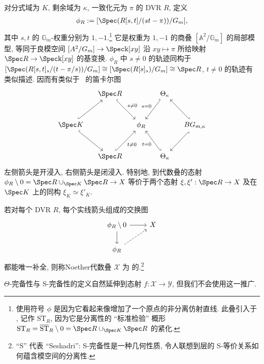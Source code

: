 对分式域为 $K$, 剩余域为 $\kappa$, 一致化元为 $\pi$ 的 DVR $R$, 定义
\begin{align}\label{src:7.9.13}
\phi_R:=[\Spec(R[s,t]/(st-\pi))/\mathbb G_m],
\end{align}
其中 $s,t$ 的 $\mathbb G_m$-权重分别为 $1,-1$.\footnote{使用符号 $\phi$ 是因为它看起来像增加了一个原点的非分离仿射直线. 此叠引入于 \cite[第~2.B 节]{Hei17}, 记作 $\overline{\mathrm{ST}}_R$, 因为它是分离性的 ``标准检验'' 概形 $\mathrm{ST}_R=\overline{\mathrm{ST}}_R\setminus0=\Spec R\cup_{\Spec K}\Spec R$ 的紧化.}
它是权重为 $1,-1$ 的商叠 $[\mathbb A^2/\mathbb G_m]$ 的局部模型, 等同于良模空间 $[\mathbb A^2/\mathbb G_m]\to\Spec\Bbbk[xy]$ 沿 $xy\mapsto\pi$ 所给映射 $\Spec R\to\Spec\Bbbk[xy]$ 的基变换. $\phi_R$ 中 $s\ne0$ 的轨迹同构于 $[\Spec(R[s,t]_s/(t-\pi/s))/\mathbb G_m]\cong[\Spec(R[s]_s)/\mathbb G_m]\cong\Spec R$, $t\ne0$ 的轨迹有类似描述. 因而有类似于~ 的笛卡尔图
\[\begin{tikzcd}[ampersand replacement=\&,column sep=small,row sep=large]
\&\Spec R\arrow[dr,hook,"{s\ne0}"]\&\&\Theta_\kappa\arrow[dl,hook',"{s=0}"']\&\\
\Spec K\arrow[ur,hook]\arrow[dr,hook]\&\&\phi_R\&\&B\mathbb G_{m,\kappa}\arrow[ul,hook']\arrow[dl,hook]\\
\&\Spec R\arrow[ur,hook,"{t\ne0}"']\&\&\Theta_\kappa\arrow[ul,hook',"{t=0}"]\&
\end{tikzcd}\]
左侧箭头是开浸入, 右侧箭头是闭浸入. 特别地, 到代数叠的态射 $\phi_R\setminus0=\Spec R\cup_{\Spec K}\Spec R\to\mathcal X$ 等价于两个态射 $\xi,\xi':\Spec R\to\mathcal X$ 及在 $\Spec K$ 上的同构 $\xi_K\simeq\xi'_K$.
\begin{definition}\label{src:7.9.14}
若对每个 DVR $R$, 每个实线箭头组成的交换图
\begin{align}\label{src:7.9.15}
\begin{tikzcd}[ampersand replacement=\&]\phi_R\setminus0\arrow[r]\arrow[d]\&\mathcal X\\\phi_R\arrow[ur,dashed]\&\end{tikzcd}
\end{align}
都能唯一补全, 则称Noether代数叠 $\mathcal X$ 为 的.\footnote{``S'' 代表 ``Seshadri'': S-完备性是一种几何性质, 令人联想到层的 S-等价关系如何蕴含模空间的分离性.}
\end{definition}
$\Theta$-完备性与 S-完备性的定义自然延伸到态射 $f:\mathcal X\to\mathcal Y$, 但我们不会使用这一推广.
